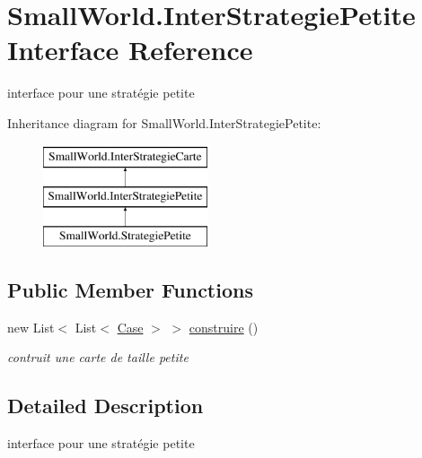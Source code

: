 \hypertarget{interface_small_world_1_1_inter_strategie_petite}{\section{Small\-World.\-Inter\-Strategie\-Petite Interface Reference}
\label{interface_small_world_1_1_inter_strategie_petite}
}


interface pour une stratégie petite  


Inheritance diagram for Small\-World.\-Inter\-Strategie\-Petite\-:\begin{figure}[H]
\begin{center}
\leavevmode
\includegraphics[height=3.000000cm]{interface_small_world_1_1_inter_strategie_petite}
\end{center}
\end{figure}
\subsection*{Public Member Functions}
\begin{DoxyCompactItemize}
\item 
new List$<$ List$<$ \hyperlink{class_small_world_1_1_case}{Case} $>$ $>$ \hyperlink{interface_small_world_1_1_inter_strategie_petite_adb06e8f32bcbb5d9f491f86f5ea34a0e}{construire} ()
\begin{DoxyCompactList}\small\item\em contruit une carte de taille petite \end{DoxyCompactList}\end{DoxyCompactItemize}


\subsection{Detailed Description}
interface pour une stratégie petite 

